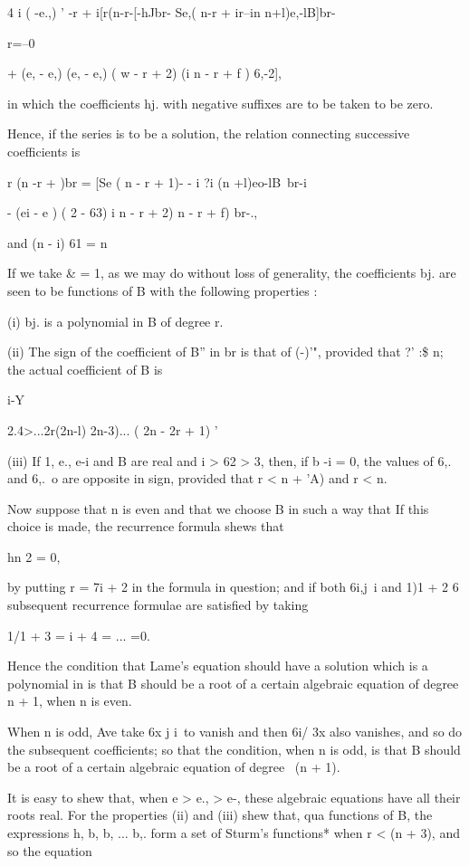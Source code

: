 {{{{4 i ( -e.,) ' -r + i[r(n-r-[-hJbr- Se,( n-r + ir--in n+l)e,-lB]br-

r=--0

+ (e, - e,) (e, - e,) ( w - r + 2) (i n - r + f ) 6,-2],

in which the coefficients hj. with negative suffixes are to be taken
to be zero.

Hence, if the series is to be a solution, the relation connecting
successive coefficients is

r (n -r + )br = [Se ( n - r + 1)- - i ?i (n +l)eo-lB\ br-i

- (ei - e ) ( 2 - 63) i n - r + 2) n - r + f) br-.,

and (n - i) 61 = n%

If we take \& = 1, as we may do without loss of generality, the
coefficients bj. are seen to be functions of B with the following
properties :

(i) bj. is a polynomial in B of degree r.

(ii) The sign of the coefficient of B'' in br is that of (-)'",
provided that ?' :\$ n; the actual coefficient of B is

i-Y

2.4>...2r(2n-l) 2n-3)... ( 2n - 2r + 1) '

(iii) If 1, e., e-i and B are real and i > 62 > 3, then, if b -i = 0,
the values of 6,. and 6,.\ o are opposite in sign, provided that r < n
+ 'A) and r < n.

Now suppose that n is even and that we choose B in such a way that If
this choice is made, the recurrence formula shews that

hn 2 = 0,

%
%

by putting r = 7i + 2 in the formula in question; and if both 6i,j\ i
and 1)1 + 2 6 subsequent recurrence formulae are satisfied by taking

 1/1 + 3 = i + 4 = ... =0.

Hence the condition that Lame's equation should have a solution which
is a polynomial in is that B should be a root of a certain algebraic
equation of degree n + 1, when n is even.

When n is odd, Ave take 6x j i\ to vanish and then 6i/ 3x also
vanishes, and so do the subsequent coefficients; so that the
condition, when n is odd, is that B should be a root of a certain
algebraic equation of degree \ (n + 1).

It is easy to shew that, when e > e., > e-, these algebraic equations
have all their roots real. For the properties (ii) and (iii) shew
that, qua functions of B, the expressions h, b, b, ... b,. form a
set of Sturm's functions* when r < (n + 3), and so the equation

}}}}
